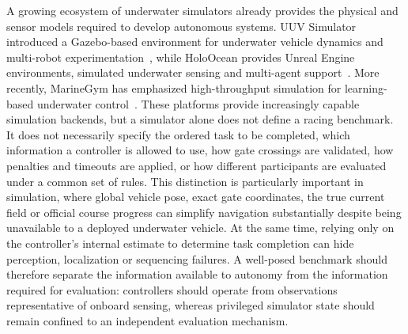 A growing ecosystem of underwater simulators already provides the physical and
sensor models required to develop autonomous systems. UUV Simulator introduced
a Gazebo-based environment for underwater vehicle dynamics and multi-robot
experimentation~\cite{manhas2016uuvsim}, while HoloOcean provides Unreal Engine
environments, simulated underwater sensing and multi-agent
support~\cite{potokar2024holoocean}. More recently, MarineGym has emphasized
high-throughput simulation for learning-based underwater
control~\cite{chu2025marinegym}. These platforms provide increasingly capable
simulation backends, but a simulator alone does not define a racing benchmark.
It does not necessarily specify the ordered task to be completed, which
information a controller is allowed to use, how gate crossings are validated,
how penalties and timeouts are applied, or how different participants are
evaluated under a common set of rules. This distinction is particularly
important in simulation, where global vehicle pose, exact gate coordinates, the
true current field or official course progress can simplify navigation
substantially despite being unavailable to a deployed underwater vehicle. At the
same time, relying only on the controller's internal estimate to determine task
completion can hide perception, localization or sequencing failures. A
well-posed benchmark should therefore separate the information available to
autonomy from the information required for evaluation: controllers should
operate from observations representative of onboard sensing, whereas privileged
simulator state should remain confined to an independent evaluation mechanism.

